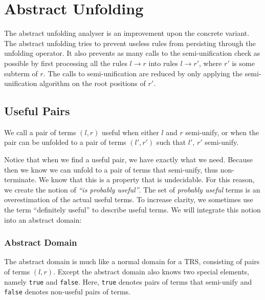 \chapter{Abstract Unfolding}\label{abstractunfolding}
The abstract unfolding analyser is an improvement upon the concrete variant. The abstract unfolding tries to prevent useless rules from persisting through the unfolding operator. It also prevents as many calls to the semi-unification check as possible by first processing all the rules $l \rightarrow r$ into rules $l \rightarrow r'$, where $r'$ is some subterm of $r$. The calls to semi-unification are reduced by only applying the semi-unification algorithm on the root positions of $r'$. 

\section{Useful Pairs}
\begin{definition}
We call a pair of terms $(l, r)$ useful when either $l$ and $r$ semi-unify, or when the pair can be unfolded to a pair of terms $(l', r')$ such that $l'$, $r'$ semi-unify.
\end{definition}
Notice that when we find a useful pair, we have exactly what we need. Because then we know we can unfold to a pair of terms that semi-unify, thus non-terminate. We know that this is a property that is undecidable. For this reason, we create the notion of \textit{``is probably useful''}. The set of \textit{probably useful} terms is an overestimation of the actual useful terms. To increase clarity, we sometimes use the term ``definitely useful'' to describe useful terms. We will integrate this notion into an abstract domain:

\subsection{Abstract Domain}
The abstract domain is much like a normal domain for a TRS, consisting of pairs of terms $(l, r)$. Except the abstract domain also knows two special elements, namely \texttt{true} and \texttt{false}. Here, \texttt{true} denotes pairs of terms that semi-unify and \texttt{false} denotes non-useful pairs of terms.

